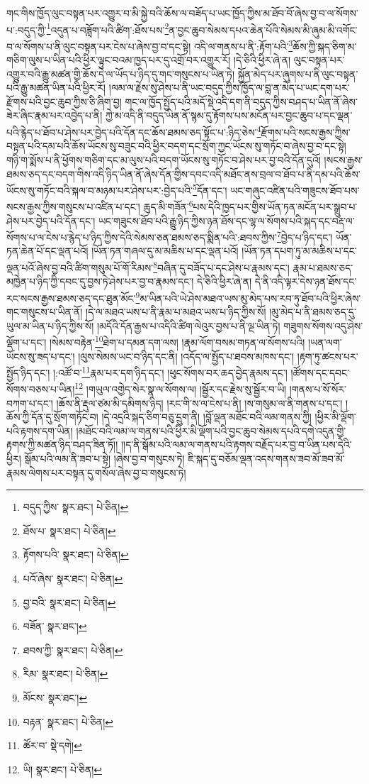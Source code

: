 གང་གིས་ཁྱོད་ལུང་བསྟན་པར་འགྱུར་བ་མི་སྐྱེ་བའི་ཆོས་ལ་བཟོད་པ་ཡང་ཁྱོད་ཀྱིས་མ་ཐོབ་བོ་ཞེས་བྱ་བ་ལ་སོགས་པ་:བདུད་ཀྱི་\footnote{བདུད་ཀྱིས་  སྣར་ཐང་།  པེ་ཅིན། }འདུན་པ་བཟློག་པའི་ཚིག་:ཐོས་པས་\footnote{ཐོས་པ་  སྣར་ཐང་།  པེ་ཅིན། }ན་བྱང་ཆུབ་སེམས་དཔའ་ཆེན་པོའི་སེམས་མི་ཞུམ་མི་འགོང་བ་ལ་སོགས་པ་ནི་ལུང་བསྟན་པར་ངེས་པ་ཞེས་བྱ་བ་དང་སྟེ། འདི་ལ་གནས་པ་ནི་:རྟོག་པའི་\footnote{རྟོགས་པའི་  སྣར་ཐང་།  པེ་ཅིན། }ཆོས་ཀྱི་སྐད་ཅིག་མ་གཅིག་ལུས་པ་ཡིན་པའི་ཕྱིར་ལྟུང་བའམ་ཁྱད་པར་དུ་འགྲོ་བར་འགྱུར་རོ། །དེ་ཅིའི་ཕྱིར་ཞེ་ན། ལུང་བསྟན་པར་འགྱུར་བའི་རྒྱུ་མཚན་གྱི་ཆོས་དེ་ལ་ཡོད་པ་ཉིད་དུ་གང་གསུངས་པ་ཡིན་ཏེ། སྐྱོན་མེད་པར་ཞུགས་པ་ནི་ལུང་བསྟན་པའི་རྒྱུ་མཚན་ཡིན་པའི་ཕྱིར་རོ། །ལམ་ལ་རྗེས་སུ་ཤེས་པ་ནི་ཡང་བདུད་ཀྱིས་ཁྱོད་ལ་བླ་ན་མེད་པ་ཡང་དག་པར་རྫོགས་པའི་བྱང་ཆུབ་ཀྱིས་ཅི་ཞིག་བྱ། གང་ལ་ཁྱོད་སྤྱོད་པའི་མདོ་སྡེ་འདི་དག་ནི་བདུད་ཀྱིས་བཤད་པ་ཡིན་ནོ་ཞེས་ཟེར་ཞིང་རྣམ་པར་འབྱེད་པ་ནི། ཀྱེ་མ་འདི་ནི་བདུད་ཡིན་ནོ་སྙམ་དུ་རྟོགས་པས་མངོན་པར་བྱང་ཆུབ་པ་དང་ལྡན་པའི་རྙེད་པ་ཐོབ་པ་ཤེས་པར་བྱེད་པའི་དོན་དང་ཆོས་ཐམས་ཅད་སྟོང་པ་:ཉིད་ཅེས་\footnote{པའོ་ཞེས་  སྣར་ཐང་།  པེ་ཅིན། }རྫོགས་པའི་སངས་རྒྱས་ཀྱིས་བསྟན་པའི་དམ་པའི་ཆོས་ཡོངས་སུ་བཟུང་བའི་ཕྱིར་བདག་དང་སྲོག་ཀྱང་ཡོངས་སུ་གཏོང་བ་ཞེས་བྱ་བ་དང་སྟེ། གཉི་ག་སྨོས་པ་ནི་ཕྱོགས་གཅིག་དང་མ་ལུས་པའི་བདག་ཡོངས་སུ་གཏོང་བ་ཤེས་པར་བྱ་བའི་དོན་དུའོ། །སངས་རྒྱས་ཐམས་ཅད་དང་བདག་གིས་འདི་ཉིད་ཡིན་ནོ་ཞེས་དོན་གྱིས་དབང་འདི་མཐོང་ནས་བྲལ་བ་ཐོབ་པ་ནི་དམ་པའི་ཆོས་ཡོངས་སུ་གཏོང་བའི་སྐལ་བ་མཉམ་པར་ཤེས་པར་:བྱེད་པའི་\footnote{བྱ་བའི་  སྣར་ཐང་།  པེ་ཅིན། }དོན་དང་། ཡང་གཞུང་འཛིན་པའི་གཟུངས་ཐོབ་པས་སངས་རྒྱས་ཀྱིས་གསུངས་པ་འཛིན་པ་དང་། ཆུད་མི་གཟོན་\footnote{བཟོན་  སྣར་ཐང་། }པས་དེའི་ཁྱད་པར་གྱིས་ཡོན་ཏན་མངོན་པར་སྒྲུབ་པ་ཤེས་པར་བྱེད་པའི་དོན་དང་། ཡང་གཟུངས་ཐོབ་པའི་རྒྱུ་ཉིད་ཀྱིས་ཉན་ཐོས་དང་ལྷ་ལ་སོགས་པའི་སྐད་དང་བརྡ་ལ་སོགས་པ་ལ་ངེས་པ་རྙེད་པ་ཉིད་ཀྱིས་དེའི་སེམས་ཅན་ཐམས་ཅད་སྨིན་པའི་:ཐབས་ཀྱིས་\footnote{ཐབས་ཀྱི་  སྣར་ཐང་།  པེ་ཅིན། }བྱེད་པ་ཉིད་དང་། ཡོན་ཏན་ཆེན་པོ་དང་ལྡན་པའོ། །ཡོན་ཏན་གཞལ་དུ་མ་མཆིས་པ་དང་ལྡན་པའོ། །ཡོན་ཏན་དཔག་ཏུ་མ་མཆིས་པ་དང་ལྡན་པའོ་ཞེས་བྱ་བའི་ཚིག་གསུམ་པོ་གོ་རིམས་\footnote{རིམ་  སྣར་ཐང་།  པེ་ཅིན། }བཞིན་དུ་བཟོད་པ་དང་ཤེས་པ་རྣམས་དང་། རྣམ་པ་ཐམས་ཅད་མཁྱེན་པ་ཉིད་ཀྱི་དབང་དུ་བྱས་ཏེ་ཤེས་པར་བྱ་བ་རྣམས་དང་། དེ་ཅིའི་ཕྱིར་ཞེ་ན། དེ་ནི་འདི་ལྟར་དེས་ཉན་ཐོས་དང་རང་སངས་རྒྱས་ཐམས་ཅད་དང་ཐུན་མོང་\footnote{མོངས་  སྣར་ཐང་། }མ་ཡིན་པའི་ཡེ་ཤེས་མཐའ་ཡས་མུ་མེད་པས་རབ་ཏུ་ཐོབ་པའི་ཕྱིར་ཞེས་གང་གསུངས་པ་ཡིན་ནོ། །དེ་ལ་མཐའ་ཡས་པ་ནི་རྣམ་པ་མཐའ་ཡས་པ་ཉིད་ཀྱིས་སོ། །མུ་མེད་པ་ནི་ཐམས་ཅད་དུ་ཡུལ་མ་ཡིན་པ་ཉིད་ཀྱིས་སོ། །མདོའི་དོན་རྒྱས་པ་འདིའི་ཚིག་ལེའུར་བྱས་པ་ནི་ལྔ་ཡིན་ཏེ། གཟུགས་སོགས་འདུ་ཤེས་ལྡོག་པ་དང་། །སེམས་བརྟེན་\footnote{བརྟན་  སྣར་ཐང་།  པེ་ཅིན། }ཐེག་པ་དམན་དག་ལས། །རྣམ་ལོག་བསམ་གཏན་ལ་སོགས་པའི། །ཡན་ལག་ཡོངས་སུ་ཟད་པ་དང་། །ལུས་སེམས་ཡང་བ་ཉིད་དང་ནི། །འདོད་ལ་སྤྱོད་པ་ཐབས་མཁས་དང་། །རྟག་ཏུ་ཚངས་པར་སྤྱོད་ཉིད་དང་། །:འཚོ་བ་\footnote{ཚོར་བ་  སྡེ་དགེ། }རྣམ་པར་དག་ཉིད་དང་། །ཕུང་སོགས་བར་ཆད་བྱེད་རྣམས་དང་། །ཚོགས་དང་དབང་སོགས་བཅས་པ་ཡིན།\footnote{ཡི།  སྣར་ཐང་།  པེ་ཅིན། } །གཡུལ་འགྱེད་སེར་སྣ་ལ་སོགས་ལ། །སྦྱོར་དང་རྗེས་སུ་སྦྱོར་བ་ཡི། །གནས་པ་སོ་སོར་བཀག་པ་དང་། །ཆོས་ནི་རྡུལ་ཙམ་མི་དམིགས་ཉིད། །རང་གི་ས་ལ་ངེས་པ་ནི། །ས་གསུམ་ལ་ནི་གནས་པ་དང་། །ཆོས་ཀྱི་དོན་དུ་སྲོག་གཏོང་བ། །དེ་འདྲའི་སྐད་ཅིག་བཅུ་དྲུག་ནི། །བློ་ལྡན་མཐོང་བའི་ལམ་གནས་ཀྱི། །ཕྱིར་མི་ལྡོག་པའི་རྟགས་དག་ཡིན། །མཐོང་བའི་ལམ་ལ་གནས་པའི་ཕྱིར་མི་ལྡོག་པའི་བྱང་ཆུབ་སེམས་དཔའི་དགེ་འདུན་གྱི་རྟགས་ཀྱི་མཚན་ཉིད་བཤད་ཟིན་ཏོ།། །།ད་ནི་སྒོམ་པའི་ལམ་ལ་གནས་པའི་རྟགས་བརྗོད་པར་བྱ་བ་ཡིན་པས་དེའི་ཕྱིར། སྒོམ་པའི་ལམ་ནི་ཟབ་པ་སྟེ། །ཞེས་བྱ་བ་གསུངས་ཏེ། ཇི་སྐད་དུ་བཅོམ་ལྡན་འདས་གནས་ཟབ་མོ་ཟབ་མོ་རྣམས་ལེགས་པར་བསྟན་དུ་གསོལ་ཞེས་བྱ་བ་གསུངས་ཏེ། 